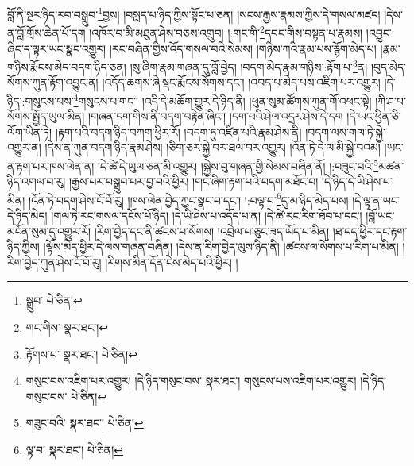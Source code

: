 བློ་ནི་སྔར་ཉིད་རབ་བསྒྲུབ་\footnote{སྒྲུབ་  པེ་ཅིན། }བྱས། །བསླད་པ་ཉིད་ཀྱིས་སྟོང་པ་ཅན། །སངས་རྒྱས་རྣམས་ཀྱིས་དེ་གསལ་མཛད། །དེས་ན་བློ་གྲོས་ཆེན་པོ་དག །འཁོར་བ་མི་མཐུན་ཤེས་བཅས་འགྲུབ། །:གང་གི་\footnote{གང་གིས་  སྣར་ཐང་། }དབང་གིས་བསྟན་པ་རྣམས། །འབྱུང་ཞིང་ད་ལྟར་ཡང་སྣང་འགྱུར། །རང་བཞིན་གྱིས་འོད་གསལ་བའི་སེམས། །གཉིས་ཀའི་རྣམ་པས་རྙོག་མེད་པ། །རྣམ་གཉིས་རྨོངས་མེད་བདག་ཉིད་ཅན། །སུ་ཞིག་རྣམ་གཞན་དུ་བློ་བྱེད། །བདག་མེད་རྣམ་གཉིས་:རྟོག་པ་\footnote{རྟོགས་པ་  སྣར་ཐང་།  པེ་ཅིན། }ན། །བུད་མེད་སོགས་ཀུན་རྟོག་འབྱུང་ན། །འདོད་ཆགས་ཞེ་སྡང་རྨོངས་སོགས་དང་། །འབད་པ་མེད་པས་འཇིག་པར་འགྱུར། །དེ་ཉིད་:གསུངས་པས་\footnote{གསུང་བས་འཇིག་པར་འགྱུར། །དེ་ཉིད་གསུང་བས་  སྣར་ཐང་། གསུངས་པས་འཇིག་པར་འགྱུར། །དེ་ཉིད་གསུང་བས་  པེ་ཅིན། }གསུངས་པ་གང་། །འདི་དེ་མཆོག་གྱུར་དེ་ཉིད་ནི། །ཕུན་སུམ་ཚོགས་ཀུན་གོ་འཕང་སྟེ། །ཀི་ཤ་པ་སོགས་སྤྱོད་ཡུལ་མིན། །གཞན་དག་གིས་ནི་བདག་བརྟེན་ཞིང་། །དག་པའི་ཤེལ་འདྲར་ཤེས་དེ་དག །དེ་ཡང་ཕྱིན་ཅི་ལོག་ཡིན་ཏེ། །རྟག་པའི་བདག་ཉིད་བཀག་ཕྱིར་རོ། །བདག་ཏུ་འཛིན་པའི་རྣམ་ཤེས་ནི། །བདག་ལས་གལ་ཏེ་སྐྱེ་འགྱུར་ན། །དེས་ན་ཀུན་བདག་ཉིད་རྣམ་ཤེས། །ཅིག་ཅར་སྐྱེ་བར་ཐལ་བར་འགྱུར། །འོན་ཏེ་དེ་ལ་མི་སྐྱེ་བའམ། །ཡང་ན་རྟག་པར་ཁས་ལེན་ན། །དེ་ཚེ་དེ་ཡུལ་ཅན་མི་འགྱུར། །སྐྱེས་བུ་གཞན་གྱི་སེམས་བཞིན་ནོ། །:བཟུང་བའི་\footnote{གཟུང་བའི་  སྣར་ཐང་།  པེ་ཅིན། }མཚན་ཉིད་འགལ་བ་རུ། །རྒྱས་པར་བསྒྲུབ་པར་བྱ་བའི་ཕྱིར། །གང་ཞིག་རྟག་པའི་བདག་མཐོང་བ། །དེ་ཉིད་དེ་ཡི་ཤེས་པ་མིན། །འོན་ཏེ་བདག་ཤེས་ངོ་བོ་རུ། །ཁས་ལེན་བྱེད་ཀྱང་སྣང་བ་དང་། །:བལྟ་བ་\footnote{ལྟ་བ་  སྣར་ཐང་།  པེ་ཅིན། }དུ་མ་ཉིད་མེད་པས། །དེ་ལྟ་ན་ཡང་དེ་ཉིད་མེད། །གལ་ཏེ་རང་གསལ་དངོས་པོ་ཉིད། །དེ་ཡི་ཤེས་པ་འདོད་པ་ན། །དེ་ཚེ་རང་རིག་ཐོབ་པ་དང་། །བློ་ཡང་མངོན་སུམ་དུ་འགྱུར་རོ། །རིག་བྱེད་དང་ནི་ཚངས་པ་སོགས། །འབྲེལ་པ་ཅུང་ཟད་ཡོད་པ་མིན། །ཐ་དད་ཕྱིར་དང་རྟག་ཉིད་ཀྱིས། །ལྟོས་མེད་ཕྱིར་དེ་ལས་གཞན་བཞིན། །དེས་ན་རིག་བྱེད་ལུས་ཉིད་ནི། །ཚངས་ལ་སོགས་པ་རིག་པ་མིན། །རིག་བྱེད་ཀུན་ཤེས་ངོ་བོ་རུ། །རིགས་མིན་དོན་ངེས་མེད་པའི་ཕྱིར། །
